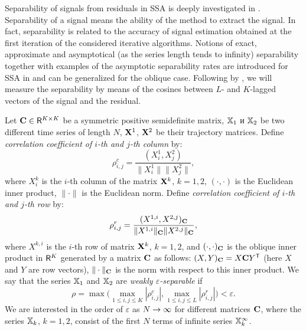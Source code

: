 \documentclass[sii]{ipart}
\begin{document}
Separability of signals from residuals in SSA is deeply investigated in \cite{Golyandina.etal2001,Golyandina2010}. Separability of a signal means the ability of the method to extract the signal. In fact, separability is related to the accuracy of signal estimation obtained at the first iteration
of the considered iterative algorithms. Notions of exact, approximate and asymptotical (as the series length tends to infinity) separability together with examples of the asymptotic separability rates are introduced for
SSA in \cite{Golyandina.etal2001} and can be generalized for the oblique case. Following by \cite{Golyandina.etal2001}, we will measure the separability by means of the cosines between $L$- and $K$-lagged vectors
of the signal and the residual.


Let $\mathbf{C} \in \mathsf{R}^{K \times K}$ be a symmetric positive semidefinite matrix, $\mathbb{X}_1$ и $\mathbb{X}_2$ be two different time series of length $N$, $\mathbf{X}^1$, $\mathbf{X}^2$ be their trajectory matrices. Define \emph{correlation coefficient of $i$-th and $j$-th column} by:
\begin{equation}\label{col_corr}
\rho^c_{i,j} = \frac{(X^1_i, X^2_j)}{\|X^1_i\| \|X^2_j\|},
\end{equation}
where $X^k_i$ is the $i$-th column of the matrix $\mathbf{X}^k$, $k = 1, 2$, $(\cdot, \cdot)$ is the Euclidean inner product, $\|\cdot\|$ is the Euclidean norm. Define \emph{correlation coefficient of $i$-th and $j$-th row} by:
\begin{equation}\label{row_corr}
\rho^r_{i,j} = \frac{(X^{1,i}, X^{2,j})_\bfC}{\|X^{1,i}\|_\bfC \|X^{2,j}\|_\bfC},
\end{equation}
where $X^{k,i}$ is the $i$-th row of matrix $\mathbf{X}^k$, $k = 1, 2$, and $(\cdot, \cdot)_{\mathbf{C}}$ is the oblique inner product in $\mathsf{R}^K$ generated by a matrix $\mathbf{C}$ as follows: $(X, Y)_{\mathbf{C}} = X \mathbf{C} Y^{\mathsf{T}}$ (here $X$ and $Y$ are row vectors), $\| \cdot \|_{\mathbf{C}}$ is the norm with respect to this inner product. We say that the series $\mathbb{X}_1$ and $\mathbb{X}_2$ are \emph{weakly $\varepsilon$-separable} if
\begin{equation}\label{weak_sep_eq}
\rho = \max\Big(\max_{1 \le i,j \le K}|\rho^c_{i,j}|, \max_{1 \le i,j \le L}|\rho^r_{i,j}|\Big) < \varepsilon.
\end{equation}
We are interested in the order of $\varepsilon$ as $N\rightarrow \infty$ for different matrices $\mathbf{C}$, where the series $\mathbb{X}_k$, $k=1,2$, consist of the first $N$ terms of infinite series $\mathbb{X}_k^\infty$.
\end{document}
